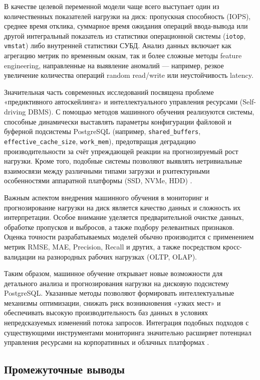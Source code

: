 В качестве целевой переменной модели чаще всего выступает один из количественных показателей нагрузки на диск: 
пропускная способность (IOPS), среднее время отклика, суммарное время ожидания операций ввода-вывода или другой интегральный 
показатель из статистики операционной системы (\texttt{iotop}, \texttt{vmstat}) либо внутренней статистики СУБД. 
Анализ данных включает как агрегацию метрик по временным окнам, так и более сложные методы feature engineering, 
направленные на выявление аномалий — например, резкое увеличение количества операций random read/write или неустойчивость latency.

Значительная часть современных исследований посвящена проблеме «предиктивного автоскейлинга» и интеллектуального управления 
ресурсами (Self-driving DBMS). \cite{Tatarnikova2023, Lapin2023} С помощью методов машинного обучения реализуются системы, способные динамически выставлять 
параметры конфигурации файловой и буферной подсистемы PostgreSQL (например, \texttt{shared\_buffers}, \texttt{effective\_cache\_size}, \texttt{work\_mem}), 
предотвращая деградацию производительности за счёт упреждающей реакции на прогнозируемый рост нагрузки. 
Кроме того, подобные системы позволяют выявлять нетривиальные взаимосвязи между различными типами загрузки и 
рхитектурными особенностями аппаратной платформы (SSD, NVMe, HDD) \cite{ozkaya2020deep}.

Важным аспектом внедрения машинного обучения в мониторинг и прогнозирование нагрузки на диск является качество данных и сложность их интерпретации. 
Особое внимание уделяется предварительной очистке данных, обработке пропусков и выбросов, а также подбору релевантных признаков. 
Оценка точности разрабатываемых моделей обычно производится с применением метрик RMSE, MAE, Precision, Recall и других, 
а также посредством кросс-валидации на разнородных рабочих нагрузках (OLTP, OLAP).

Таким образом, машинное обучение открывает новые возможности для детального анализа и прогнозирования нагрузки на дисковую подсистему PostgreSQL. 
Указанные методы позволяют формировать интеллектуальные механизмы оптимизации, 
снижать риск возникновения «узких мест» и обеспечивать высокую производительность баз данных в условиях непредсказуемых изменений 
потока запросов. Интеграция подобных подходов с существующими инструментами мониторинга значительно расширяет потенциал управления 
ресурсами на корпоративных и облачных платформах \cite{sun2023predictive, ozkaya2020deep}.


\subsection{Промежуточные выводы}


